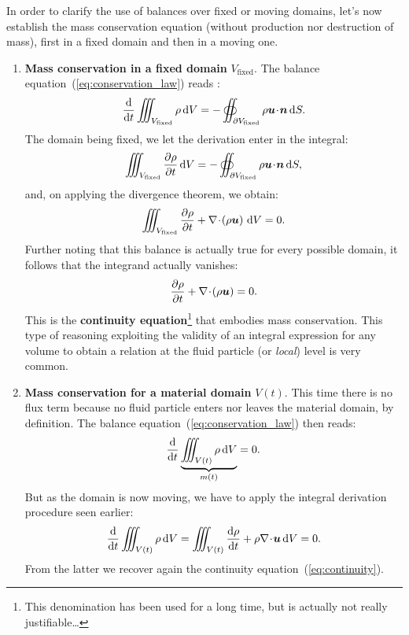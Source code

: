In order to clarify the use of balances over fixed or moving domains, let's now establish the mass conservation equation (without production nor destruction of mass), first in a fixed domain and then in a moving one.
\begin{enumerate}
\item \textbf{Mass conservation in a fixed domain} $V_\text{fixed}$. The balance equation~(\ref{eq:conservation_law}) reads :
\begin{equation}
\dd{}{t}\iiint_{V_\text{fixed}} \rho \, \dV = - \oiint_{\partial V_\text{fixed}} \rho \bu \!\cdot\! \bn \, \dS.
\end{equation}
The domain being fixed, we let the derivation enter in the integral:
\begin{equation}
\iiint_{V_\text{fixed}} \pd{\rho}{t} \, \dV = - \oiint_{\partial V_\text{fixed}} \rho \bu \!\cdot\! \bn \, \dS,
\end{equation}
and, on applying the divergence theorem, we obtain:
\begin{equation}
\iiint_{V_\text{fixed}} \pd{\rho}{t}  + \nabla \!\cdot\! \lp\rho \bu \rp \, \dV = 0.
\end{equation}
Further noting that this balance is actually true for every possible domain, it follows that the integrand actually vanishes:
\begin{equation}
\pd{\rho}{t}  + \nabla \!\cdot\! \lp\rho \bu \rp = 0.
\label{eq:continuity}
\end{equation}
This is the \textbf{continuity equation}\footnote{This denomination has been used for a long time, but is actually not really justifiable\dots} that embodies mass conservation. This type of reasoning exploiting the validity of an integral expression for any volume to obtain a relation at the fluid particle (or \textit{local}) level is very common.
\item \textbf{Mass conservation for a material domain} $V(t)$. This time there is no flux term because no fluid particle enters nor leaves the material domain, by definition. The balance equation~(\ref{eq:conservation_law}) then reads:
\begin{equation}
\frac{\mathrm d }{\mathrm d t}\underbrace{\iiint_{V(t)} \rho \, \mathrm dV}_{m(t)} = 0.
\end{equation}
But as the domain is now moving, we have to apply the integral derivation procedure seen earlier:
\begin{equation}
\dd{}{t} \iiint_{V(t)} \rho\, \dV = \iiint_{V(t)} \dd{\rho}{t} + \rho \nabla \!\cdot\! \bu\,\dV = 0.
\end{equation}
From the latter we recover again the continuity equation~(\ref{eq:continuity}).
\end{enumerate}
